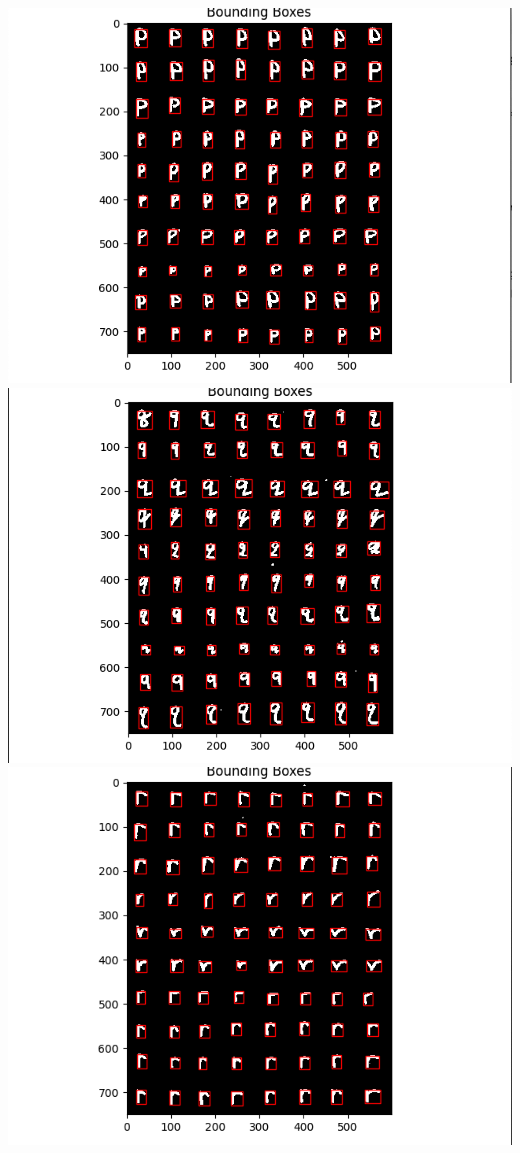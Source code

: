 \documentclass[12pt]{article}
\begin{document}
\includegraphics*[scale=0.5]{pBounds} \\
\includegraphics*[scale=0.5]{qBounds} \\
\includegraphics*[scale=0.5]{rBounds} \\
\end{document}
